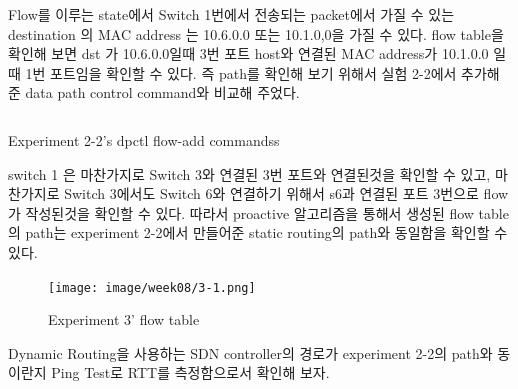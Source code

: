        Flow를 이루는 state에서 Switch 1번에서 전송되는 packet에서 가질 수 있는 destination 의 MAC address 는 10.6.0.0 또는 10.1.0,0을 가질 수 있다. flow table을 확인해 보면 dst 가 10.6.0.0일때 3번 포트 host와 연결된 MAC address가 10.1.0.0 일때 1번 포트임을 확인할 수 있다. 즉 path를 확인해 보기 위해서 실험 2-2에서 추가해준 data path control command와 비교해 주었다.  
        \clearpage
        \begin{listing}[h!]
        \inputminted[framerule = 1pt,framesep = 2mm , frame = lines, fontsize=\footnotesize]{python}{./code/week08/flow2-2.sh}
        \vspace{-2mm}
        \caption{\footnotesize Experiment 2-2's dpctl flow-add commandss}
        \end{listing}
        
        switch 1 은 마찬가지로 Switch 3와 연결된 3번 포트와 연결된것을 확인할 수 있고, 마찬가지로 Switch 3에서도 Switch 6와 연결하기 위해서 s6과 연결된 포트 3번으로 flow가 작성된것을 확인할 수 있다. 따라서 proactive 알고리즘을 통해서 생성된 flow table의 path는 experiment 2-2에서 만들어준 static routing의 path와 동일함을 확인할 수 있다.\\
        \vspace{-4mm}
        \begin{figure}[!h]\centering 
        	\texttt{[image: image/week08/3-1.png]}
        	\caption{\footnotesize
        	  Experiment 3' flow table}
        	\vspace{-10pt}
        \end{figure}
            
        Dynamic Routing을 사용하는 SDN controller의 경로가  experiment 2-2의 path와 동이란지 Ping Test로 RTT를 측정함으로서 확인해 보자.
        \clearpage
